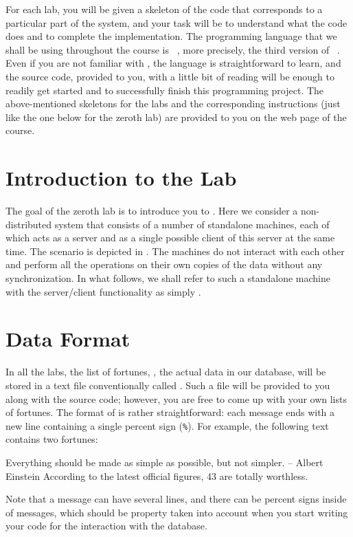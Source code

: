 \documentclass[a4paper,10pt]{article}
\begin{document}
For each lab, you will be given a skeleton of the code that corresponds to a
particular part of the system, and your task will be to understand what the code
does and to complete the implementation. The programming language that we shall
be using throughout the course is \python\ \cite{language}, more precisely, the
third version of \python\ \cite{python}. Even if you are not familiar with
\python, the language is straightforward to learn, and the source code, provided
to you, with a little bit of reading \cite{python-tutorial, python-library} will
be enough to readily get started and to successfully finish this programming
project. The above-mentioned skeletons for the labs and the corresponding
instructions (just like the one below for the zeroth lab) are provided to you on
the web page \cite{course} of the course.

\section{Introduction to the Lab}

The goal of the zeroth lab is to introduce you to \python. Here we consider a
non-distributed system that consists of a number of standalone machines, each of
which acts as a server and as a single possible client of this server at the
same time. The scenario is depicted in . The machines do
not interact with each other and perform all the operations on their own copies
of the data without any synchronization. In what follows, we shall refer to such
a standalone machine with the server/client functionality as simply
.

\section{Data Format} 
In all the labs, the list of fortunes, \ie, the actual data in our database,
will be stored in a text file conventionally called . Such
a file will be provided to you along with the source code; however, you are free
to come up with your own lists of fortunes. The format of 
is rather straightforward: each message ends with a new line containing a single
percent sign (\texttt{\%}). For example, the following text contains two
fortunes:
\begin{fortune}
Everything should be made as simple as possible, but not simpler.
    -- Albert Einstein
%
According to the latest official figures, 43%
are totally worthless.
%
\end{fortune}
Note that a message can have several lines, and there can be percent signs
inside of messages, which should be property taken into account when you start
writing your code for the interaction with the database.
\end{document}
